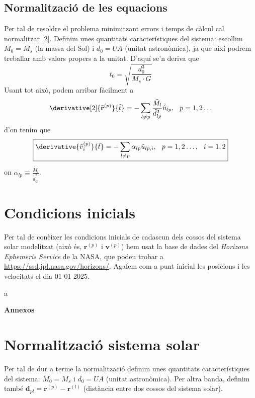\documentclass[10pt, twoside, a4paper]{article}
\begin{document}
\subsection{Normalització de les equacions}
Per tal de resoldre el problema minimitzant errors i temps de càlcul cal normalitzar \eqref{2}. Definim unes quantitats característiques del sistema: escollim $M_0 = M_s$ (la massa del Sol) i $d_0 = UA$ (unitat astronòmica), ja que així podrem treballar amb valors propers a la unitat. D'aquí se'n deriva que
\begin{equation*}
    t_0 = \sqrt{\frac{d_0^3}{M_s \cdot G}}
\end{equation*}
Usant tot això, podem arribar fàcilment a 
\begin{equation}
    \derivative[2]{\mathbf{\tilde{r}}^{(p)}}{\tilde{t}} = - \sum_{l \neq p} \frac{\tilde{M_l}}{\tilde{d}_{lp}^2} \tilde{\hat{u}}_{lp}, \hspace{0.25cm} p = 1,2 \ldots
\end{equation}
d'on tenim que
\begin{equation}
    \boxed{\derivative{\tilde{v}_i^{(p)}}{\tilde{t}} = - \sum_{l \neq p} \alpha_{lp} \tilde{u}_{lp,i}, \hspace{0.25cm} p = 1,2 \ldots, \hspace{0.25cm} i = 1, 2}
\end{equation}
on $\alpha_{lp} \equiv \frac{\tilde{M_l}}{\tilde{d}_{lp}^2}$.

\section{Condicions inicials}
Per tal de conèixer les condicions inicials de cadascun dels cossos del sistema solar modelitzat (això és, $\mathbf{r}^{(p)}$ i $\mathbf{v}^{(p)}$) hem usat la base de dades del \textit{Horizons Ephemeris Service} de la NASA, que podeu trobar a \url{https://ssd.jpl.nasa.gov/horizons/}. Agafem com a punt inicial les posicions i les velocitats el dia 01-01-2025.


\newpage
\begin{thebibliography}
    a
\end{thebibliography}

\newpage
\appendix
{\Huge{\textbf{Annexos}}}
\section{Normalització sistema solar}
Per tal de dur a terme la normalització definim unes quantitats característiques del sistema: $M_0 = M_s$ i $d_0 = UA$ (unitat astronòmica). Per altra banda, definim també $\mathbf{d}_{pl} = \mathbf{r}^{(p)}-\mathbf{r}^{(l)}$ (distància entre dos cossos del sistema solar).
\end{document}

